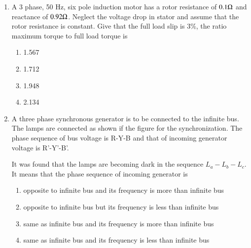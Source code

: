 \documentclass[journal,12pt,onecolumn]{IEEEtran}
\theoremstyle{remark}
\begin{document}
\begin{enumerate}
\item A 3 phase, 50 Hz, six pole induction motor has a rotor resistance of $0.1\ohm$ and reactance of $0.92\ohm$. Neglect the voltage drop in stator and assume that the rotor resistance is constant. Give that the full load slip is $3\%$, the ratio maximum torque to full load torque is
\begin{enumerate}
    \item 1.567
    \item 1.712
    \item 1.948
    \item 2.134
\end{enumerate}
\item A three phase synchronous generator is to be connected to the infinite bus. The lamps are connected as shown if the figure for the synchronization. The phase sequence of bus voltage is R-Y-B and that of incoming generator voltage is R'-Y'-B'.
\begin{figure}[!ht]
\centering
\resizebox{0.4\textwidth}{!}{
	
}%
\end{figure}
It was found that the lamps are becoming dark in the sequence $L_{a}-L_{b}-L_{c}$. It means that the phase sequence of incoming generator is
\begin{enumerate}
    \item opposite to infinite bus and its frequency is more than infinite bus
    \item opposite to infinite bus but its frequency is less than infinite bus
    \item same as infinite bus and its frequency is more than infinite bus
    \item same as infinite bus and its frequency is less than infinite bus
\end{enumerate}
\end{enumerate}
\end{document}
